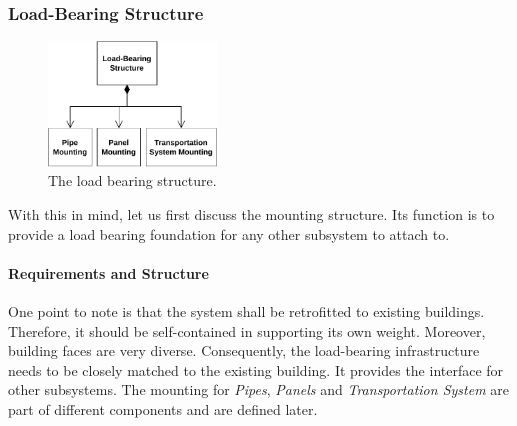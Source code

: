 \pagebreak

\subsubsection{Load-Bearing Structure}
\begin{figure}
	\includegraphics[width=0.4\textwidth]{img/architecture/load.pdf}
	\caption{The load bearing structure.}
	\label{wfig:load}
\end{figure} 
With this in mind, let us first discuss the mounting structure.
Its function is to provide a load bearing foundation for any other subsystem to attach to.
\paragraph{Requirements and Structure}
One point to note is that the system shall be retrofitted to existing buildings.
Therefore, it should be self-contained in supporting its own weight.
Moreover, building faces are very diverse.
Consequently, the load-bearing infrastructure needs to be closely matched to the existing building.
It provides the interface for other subsystems.
The mounting for \textit{Pipes}, \textit{Panels} and \textit{Transportation System} are part of different components and are defined later.

